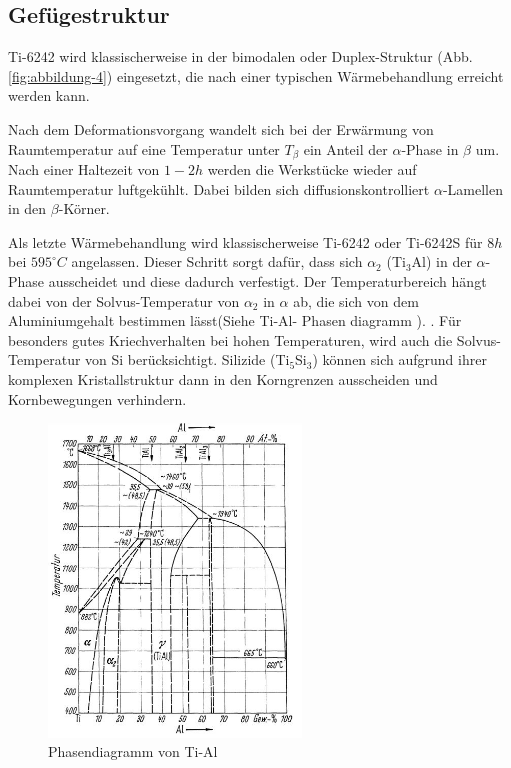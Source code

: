 \subsection{Gefügestruktur}

Ti-6242 wird klassischerweise in der bimodalen oder Duplex-Struktur (Abb. \ref{fig:abbildung-4}) eingesetzt, die nach einer typischen Wärmebehandlung  erreicht werden kann.

Nach dem Deformationsvorgang wandelt sich bei der Erwärmung von Raumtemperatur  auf eine Temperatur unter $T_{\beta}$  ein Anteil der $\alpha$-Phase in $\beta$ um. Nach einer Haltezeit von $1-2h$ werden die Werkstücke wieder auf Raumtemperatur luftgekühlt.
Dabei bilden sich diffusionskontrolliert $\alpha$-Lamellen in den  $\beta$-Körner.


Als letzte Wärmebehandlung wird klassischerweise  Ti-6242 oder Ti-6242S für  $8 h$ bei $595^\circ C$ angelassen. Dieser Schritt sorgt dafür, dass sich $\alpha_2$ (Ti$_3$Al) in der $\alpha$-Phase ausscheidet und diese dadurch verfestigt. Der Temperaturbereich hängt dabei von der Solvus-Temperatur von $\alpha_2$ in $\alpha$ ab, die sich von dem Aluminiumgehalt bestimmen lässt(Siehe Ti-Al- Phasen diagramm ). \cite{Lutjering.2007}.
Für besonders gutes Kriechverhalten bei hohen Temperaturen, wird auch die Solvus-Temperatur von Si berücksichtigt. Silizide (Ti$_5$Si$_3$) können sich aufgrund ihrer komplexen Kristallstruktur dann in den Korngrenzen ausscheiden und Kornbewegungen verhindern.

\begin{figure}
	\centering
	\includegraphics[width=0.6\textwidth]{./Bilder/TiAl.jpg}
	\caption{Phasendiagramm von Ti-Al \cite{Zwicker.2014}}
	\label{fig:PD_tial}
\end{figure}




